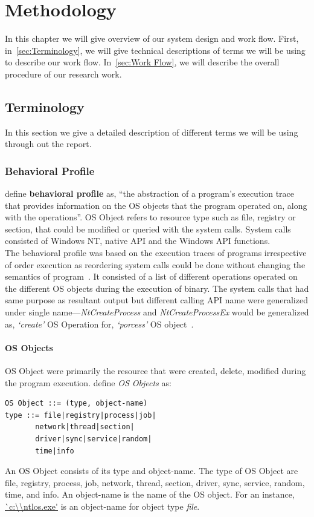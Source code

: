 \chapter{Methodology}\label{chapter:methodology}
In this chapter we will give overview of our system design and work flow.
First, in~\autoref{sec:Terminology}, we will give technical descriptions of terms we will be using to describe our work flow.
In~\autoref{sec:Work Flow}, we will describe the overall procedure of our research work.
\section{Terminology}
\label{sec:Terminology}
In this section we give a detailed description of different terms we will be using through out the report.
\subsection{Behavioral Profile}
\label{sub:Behavioral Profile}
\citeauthor{bayer} define \textbf{behavioral profile} as, ``the abstraction of a program's execution trace that provides information on the OS objects that the program operated on, along with the operations''.
OS Object refers to resource type such as file, registry or section, that could be modified or queried with the system calls.
System calls consisted of Windows NT, native API and the Windows API functions.\\

The behavioral profile was based on the execution traces of programs irrespective of order execution as reordering system calls could be done without changing the semantics of program~\cite[]{bayer}.
It consisted of a list of different operations operated on the different OS objects during the execution of binary.
The system calls that had same purpose as resultant output but different calling API name were generalized under single name---\emph{NtCreateProcess} and \emph{NtCreateProcessEx} would be generalized as, \emph{`create'} OS Operation for, \emph{`porcess'} OS object~\cite[]{bayer}.\\
\subsubsection{OS Objects}
\label{ssub:OS Objects}
OS Object were primarily the resource that were created, delete, modified during the program execution.
\citeauthor{bayer} define \emph{OS Objects} as:
\begin{lstlisting}[numbers=none]
OS Object ::= (type, object-name)
type ::= file|registry|process|job|
       network|thread|section|
       driver|sync|service|random|
       time|info
\end{lstlisting}
An OS Object consists of its type and object-name.
The type of OS Object are file, registry, process, job, network, thread, section, driver, sync, service, random, time, and info.
An object-name is the name of the OS object.
For an instance, \url{`c:\\ntlos.exe'} is an object-name for object type \emph{file}.

